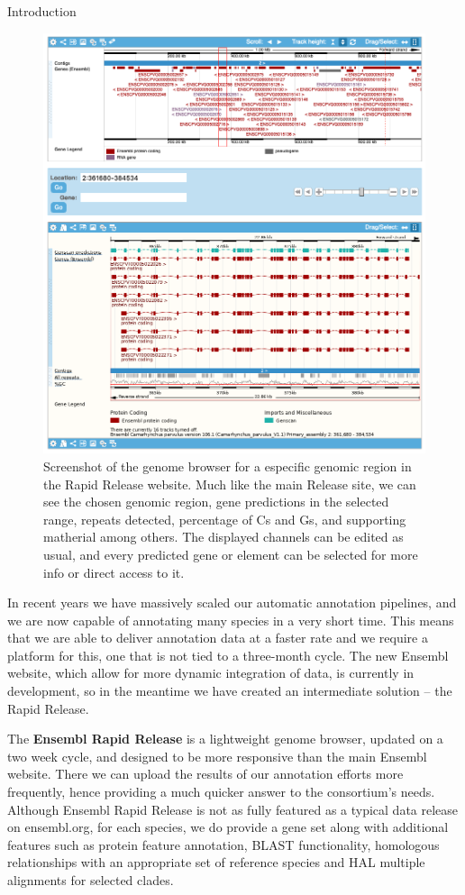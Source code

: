 \documentclass[final]{beamer}
\newlength{\colwidth}
\begin{document}
\begin{frame}[t]
\begin{columns}[t]
\begin{column}{\colwidth}
\begin{block}{Introduction}
\begin{figure}
  \centering
  \includegraphics[width=0.95\columnwidth]{eg.png}      
    \caption{Screenshot of the genome browser for a especific genomic region in the Rapid Release website. Much like the main Release site, we can see the chosen genomic region, gene predictions in the selected range, repeats detected, percentage of Cs and Gs, and supporting matherial among others. The displayed channels can be edited as usual, and every predicted gene or element can be selected for more info or direct access to it.}
  \label{tree}
\end{figure}

In recent years we have massively scaled our automatic annotation pipelines, and we are now capable of annotating many species in a very short time.
This means that we are able to deliver annotation data at a faster rate and we require a platform for this, one that is not tied to a three-month cycle.
The new Ensembl website, which allow for more dynamic integration of data, is currently in development, so in the meantime we have created an intermediate solution – the Rapid Release.

The \textbf{Ensembl Rapid Release} is a lightweight genome browser, updated on a two week cycle, and designed to be more responsive than the main Ensembl website.
There we can upload the results of our annotation efforts more frequently, hence providing a much quicker answer to the consortium's needs.
Although Ensembl Rapid Release is not as fully featured as a typical data release on ensembl.org, for each species, we do provide a gene set along with additional features such as protein feature annotation, BLAST functionality, homologous relationships with an appropriate set of reference species and HAL multiple alignments for selected clades.


\end{block}
\end{column}
\end{columns}
\end{frame}
\end{document}

